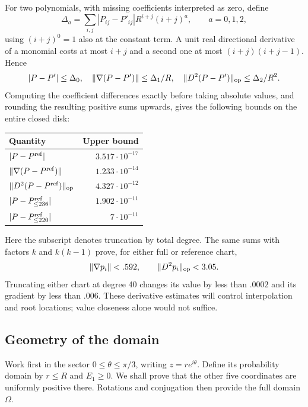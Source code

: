 For two polynomials, with missing coefficients interpreted as zero, define
\[
 \Delta_a=\sum_{i,j}|P_{ij}-P'_{ij}|R^{i+j}(i+j)^a,
       \qquad a=0,1,2,
\]
using $(i+j)^0=1$ also at the constant term.  A unit real directional
derivative of a monomial costs at most $i+j$ and a second one at most
$(i+j)(i+j-1)$.  Hence
\begin{equation}\label{cert:jet-comparison}
 |P-P'|\leq\Delta_0,\quad
 \|\nabla(P-P')\|\leq\Delta_1/R,\quad
 \|D^2(P-P')\|_{\rm op}\leq\Delta_2/R^2.
\end{equation}
Computing the coefficient differences exactly before taking absolute values,
and rounding the resulting positive sums upwards, gives the following
bounds on the entire closed disk:
\begin{center}
\begin{tabular}{lr}\toprule
Quantity&Upper bound\\\midrule
$|P-P^{\rm ref}|$&$3.517\cdot10^{-17}$\\
$\|\nabla(P-P^{\rm ref})\|$&$1.233\cdot10^{-14}$\\
$\|D^2(P-P^{\rm ref})\|_{\rm op}$&$4.327\cdot10^{-12}$\\
$|P-P^{\rm ref}_{\leq236}|$&$1.902\cdot10^{-11}$\\
$|P-P^{\rm ref}_{\leq220}|$&$7\cdot10^{-11}$\\\bottomrule
\end{tabular}
\end{center}
Here the subscript denotes truncation by total degree.  The same sums with
factors $k$ and $k(k-1)$ prove, for either full or reference chart,
\begin{equation}\label{cert:chart-jets}
 \|\nabla p_i\|<.592,\qquad \|D^2p_i\|_{\rm op}<3.05.
\end{equation}
Truncating either chart at degree 40 changes its value by less than $.0002$
and its gradient by less than $.006$.  These derivative estimates will
control interpolation and root locations; value closeness alone would not
suffice.

\subsection{Geometry of the domain}
\label{cert:geometry}

Work first in the sector $0\leq\theta\leq\pi/3$, writing $z=re^{i\theta}$.
Define its probability domain by $r\leq R$ and $E_1\geq0$.  We shall prove
that the other five coordinates are uniformly positive there.  Rotations
and conjugation then provide the full domain $\Omega$.

